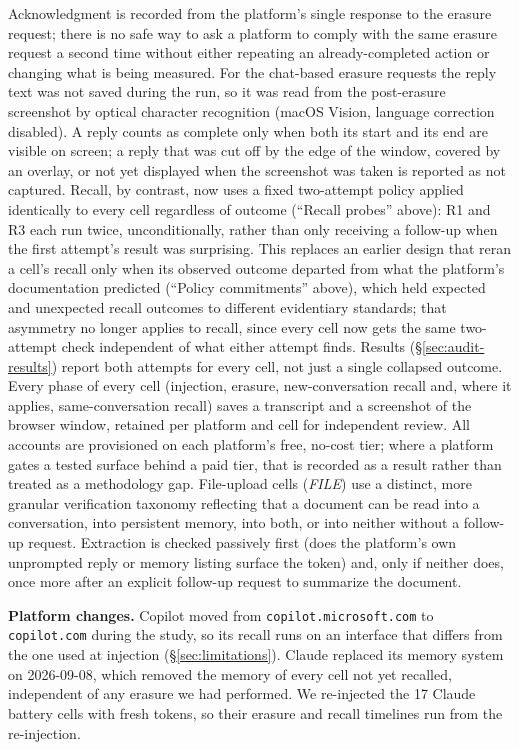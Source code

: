 \documentclass[conference,compsoc]{IEEEtran}
\begin{document}
Acknowledgment is recorded from the platform's single response to the
erasure request; there is no safe way to ask a platform to comply with the
same erasure request a second time without either repeating an
already-completed action or changing what is being measured. For the
chat-based erasure requests the reply text was not saved during the run,
so it was read from the post-erasure screenshot by optical character
recognition (macOS Vision, language correction disabled). A reply counts
as complete only when both its start and its end are visible on screen; a
reply that was cut off by the edge of the window, covered by an overlay, or
not yet displayed when the screenshot was taken is reported as not
captured.
Recall, by contrast, now uses a fixed
two-attempt policy applied identically to every cell regardless of
outcome (``Recall probes'' above): R1 and R3 each run twice,
unconditionally, rather than only receiving a follow-up when the first
attempt's result was surprising. This replaces an earlier design that
reran a cell's recall only when its observed outcome departed from what
the platform's documentation predicted (``Policy commitments'' above),
which held expected and unexpected recall outcomes to
different evidentiary standards; that asymmetry no longer applies to
recall, since every cell now gets the same two-attempt check independent
of what either attempt finds. Results (\S\ref{sec:audit-results}) report
both attempts for every cell, not just a single collapsed outcome. Every
phase of every cell (injection, erasure, new-conversation recall and,
where it applies, same-conversation recall) saves a transcript and a screenshot of the browser
window, retained per platform and cell for independent review. All accounts
are provisioned on each platform's free, no-cost tier; where a platform
gates a tested surface behind a paid tier, that is recorded as a result
rather than treated as a methodology gap. File-upload cells (\textit{FILE})
use a distinct, more granular verification taxonomy reflecting that a
document can be read into a conversation, into persistent memory, into
both, or into neither without a follow-up request. Extraction is
checked passively first (does the platform's own unprompted reply or
memory listing surface the token) and, only if neither does, once more
after an explicit follow-up request to summarize the document.

\textbf{Platform changes.} Copilot moved from \texttt{copilot.microsoft.com}
to \texttt{copilot.com} during the study, so its recall runs on an interface
that differs from the one used at injection (\S\ref{sec:limitations}). Claude
replaced its memory system on 2026-09-08, which removed the memory of every
cell not yet recalled, independent of any erasure we had performed. We
re-injected the 17 Claude battery cells with fresh tokens, so their erasure
and recall timelines run from the re-injection.
\end{document}
